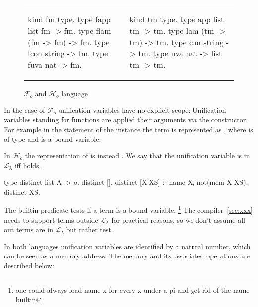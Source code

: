 \documentclass[sigconf,natbib=false]{acmart}
\newcommand{\llambda}{\ensuremath{\mathcal{L}_\lambda}\xspace}
\newcommand{\Fo}{\ensuremath{\mathcal{F}_{\!o}\xspace}} %
\newcommand{\Ho}{\ensuremath{\mathcal{H}_o}\xspace}
\begin{document}
\begin{figure}[H]
  \begin{tabular}{ll}
  \begin{minipage}{0.21\textwidth}
  \begin{elpicodetab}
kind fm type.
type fapp list fm -> fm.
type flam (fm -> fm) -> fm.
type fcon string -> fm.
type fuva nat -> fm.
\end{elpicodetab}
  \end{minipage}
  &
  \begin{minipage}{0.24\textwidth}
  \begin{elpicodetab}
kind tm type.
type app list tm -> tm.
type lam (tm -> tm) -> tm.
type con string -> tm.
type uva nat -> list tm -> tm.
  \end{elpicodetab}
  \end{minipage}
  \end{tabular}
  \caption{\Fo{} and \Ho language}\vspace{0.3em}
  \label{code:common-terms}
\end{figure}

\noindent
In the case of \Fo{} unification variables  have no explicit scope:
Unification variables standing for functions are applied their arguments
via the  constructor.
For example in the statement of the instance  the
term  is represented as , where 
is of type  and  is a bound variable.

In \Ho the representation of  is instead .
We say that the unification variable  is in \llambda iff
 holds.

\begin{elpicode}
type distinct list A -> o.
distinct [].
distinct [X|XS] :- name X, not(mem X XS), distinct XS.
\end{elpicode}

\noindent
The  builtin predicate tests if a term is a bound variable.
\footnote{one could always load name x for every x under a pi and get rid of the name builtin}
The
compiler~\ref{sec:xxx} needs to support terms outside \llambda for practical
reasons, so we don't assume all out terms are in \llambda but rather test.

In both languages unification variables are identified by a natural number,
which can be seen as a memory address. The memory and its associated
operations are described below:
\end{document}
